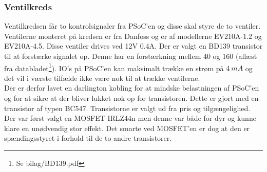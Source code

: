 \subsubsection{Ventilkreds}
Ventilkredsen får to kontrolsignaler fra PSoC'en og disse skal styre de to ventiler. Ventilerne monteret på kredsen er fra Danfoss og er af modellerne EV210A-1.2 og EV210A-4.5. Disse ventiler drives ved 12V 0.4A. Der er valgt en BD139 transistor til at forstærke signalet op. Denne har en forstærkning mellem 40 og 160 (aflæst fra databladet\footnote{Se bilag/BD139.pdf}). IO's på PSoC'en kan maksimalt trække en strøm på $\SI{4}{mA}$ og det vil i værste tilfælde ikke være nok til at trække ventilerne.\\
Der er derfor lavet en darlington kobling for at mindske belastningen af PSoC'en og for at sikre at der bliver lukket nok op for transistoren. Dette er gjort med en transistor af typen BC547. Transistorne er valgt ud fra pris og tilgængelighed. Der var først valgt en MOSFET IRLZ44n men denne var både for dyr og kunne klare en unødvendig stor effekt. Det smarte ved MOSFET'en er dog at den er spændingsstyret i forhold til de to andre transistorer. 


